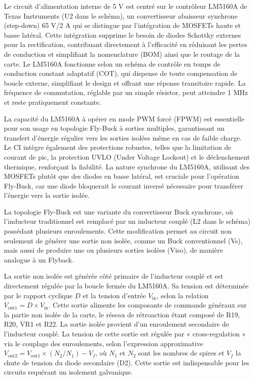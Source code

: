 Le circuit d'alimentation interne de 5 V est centré sur le contrôleur LM5160A de Texas Instruments (U2 dans le schéma), un convertisseur abaisseur synchrone (step-down) 65 V/2 A qui se distingue par l'intégration de MOSFETs haute et basse latéral. Cette intégration supprime le besoin de diodes Schottky externes pour la rectification, contribuant directement à l'efficacité en réduisant les pertes de conduction et simplifiant la nomenclature (BOM) ainsi que le routage de la carte. Le LM5160A fonctionne selon un schéma de contrôle en temps de conduction constant adaptatif (COT), qui dispense de toute compensation de boucle externe, simplifiant le design et offrant une réponse transitoire rapide. La fréquence de commutation, réglable par un simple résistor, peut atteindre 1 MHz et reste pratiquement constante.

La capacité du LM5160A à opérer en mode PWM forcé (FPWM) est essentielle pour son usage en topologie Fly-Buck à sorties multiples, garantissant un transfert d'énergie régulier vers les sorties isolées même en cas de faible charge. Le CI intègre également des protections robustes, telles que la limitation de courant de pic, la protection UVLO (Under Voltage Lockout) et le déclenchement thermique, renforçant la fiabilité. La nature synchrone du LM5160A, utilisant des MOSFETs plutôt que des diodes en basse latéral, est cruciale pour l'opération Fly-Buck, car une diode bloquerait le courant inversé nécessaire pour transférer l'énergie vers la sortie isolée.

La topologie Fly-Buck est une variante du convertisseur Buck synchrone, où l'inducteur traditionnel est remplacé par un inducteur couplé (L2 dans le schéma) possédant plusieurs enroulements. Cette modification permet au circuit non seulement de générer une sortie non isolée, comme un Buck conventionnel (Vs), mais aussi de produire une ou plusieurs sorties isolées (Viso), de manière analogue à un Flyback.

La sortie non isolée est générée côté primaire de l'inducteur couplé et est directement régulée par la boucle fermée du LM5160A. Sa tension est déterminée par le rapport cyclique \(D\) et la tension d'entrée \(V_{\text{in}}\), selon la relation \(V_{\text{out1}} = D \times V_{\text{in}}\). Cette sortie alimente les composants de commande généraux sur la partie non isolée de la carte, le réseau de rétroaction étant composé de R19, R20, VR1 et R22. La sortie isolée provient d'un enroulement secondaire de l'inducteur couplé. La tension de cette sortie est régulée par « cross-regulation » via le couplage des enroulements, selon l'expression approximative \(V_{\text{out2}} = V_{\text{out1}} \times (N_2/N_1) - V_f\), où \(N_1\) et \(N_2\) sont les nombres de spires et \(V_f\) la chute de tension du diode secondaire (D2). Cette sortie est indispensable pour les circuits requérant un isolement galvanique.

